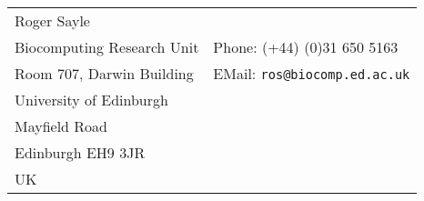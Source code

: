 \begin{center}\begin{tabular}{ll}
Roger Sayle  & \\
Biocomputing Research Unit & Phone: (+44) (0)31 650 5163 \\
Room 707, Darwin Building  & EMail: \verb"ros@biocomp.ed.ac.uk" \\
University of Edinburgh & \\
Mayfield Road & \\
Edinburgh EH9 3JR & \\
\quad\quad UK &
\end{tabular}\end{center}

\nocite{Max83}

\nocite{Sayle90,Sayle92}


\printindex

